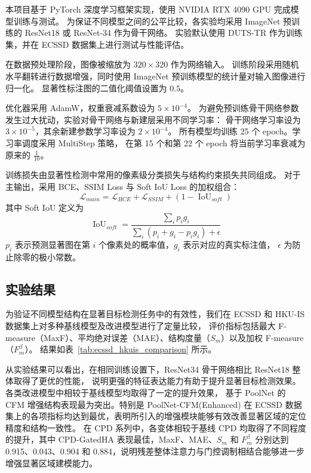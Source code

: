 \documentclass[UTF8,a4paper,10pt]{ctexart}
\begin{document}
本项目基于 PyTorch 深度学习框架实现，使用 NVIDIA RTX 4090 GPU 完成模型训练与测试。
为保证不同模型之间的公平比较，各实验均采用 ImageNet 预训练的 ResNet18 或 ResNet-34 作为骨干网络。
实验默认使用 DUTS-TR 作为训练集，并在 ECSSD 数据集上进行测试与性能评估。

在数据预处理阶段，图像被缩放为 $320 \times 320$ 作为网络输入。
训练阶段采用随机水平翻转进行数据增强，同时使用 ImageNet 预训练模型的统计量对输入图像进行归一化。
显著性标注图的二值化阈值设置为 $0.5$。

优化器采用 AdamW，权重衰减系数设为 $5\times10^{-4}$。
为避免预训练骨干网络参数发生过大扰动，实验对骨干网络与新建层采用不同学习率：
骨干网络学习率设为 $3\times10^{-5}$，其余新建参数学习率设为 $2\times10^{-4}$。
所有模型均训练 25 个 epoch。学习率调度采用 MultiStep 策略，
在第 15 个和第 22 个 epoch 将当前学习率衰减为原来的 $\frac{1}{10}$。

训练损失由显著性检测中常用的像素级分类损失与结构约束损失共同组成。
对于主输出，采用 BCE、SSIM Loss 与 Soft IoU Loss 的加权组合：
\[
\mathcal{L}_{main}
=
\mathcal{L}_{BCE}
+
\mathcal{L}_{SSIM}
+
\left(1-\operatorname{IoU}_{soft}\right)
\]
其中 Soft IoU 定义为
\[
\operatorname{IoU}_{soft}
=
\frac{\sum_i p_i g_i}
{\sum_i (p_i + g_i - p_i g_i) + \epsilon}
\]
$p_i$ 表示预测显著图在第 $i$ 个像素处的概率值，$g_i$ 表示对应的真实标注值，
$\epsilon$ 为防止除零的极小常数。



\subsection{实验结果}

为验证不同模型结构在显著目标检测任务中的有效性，我们在 ECSSD 和 HKU-IS 数据集上对多种基线模型及改进模型进行了定量比较，
评价指标包括最大 F-measure（MaxF）、平均绝对误差（MAE）、结构度量（$S_m$）以及加权 F-measure（$F_m^{\beta}$）。
结果如表~\ref{tab:ecssd_hkuis_comparison} 所示。

从实验结果可以看出，在相同训练设置下，ResNet34 骨干网络相比 ResNet18 整体取得了更优的性能，
说明更强的特征表达能力有助于提升显著目标检测效果。各类改进模型中相较于基线模型均取得了一定的提升效果，
基于 PoolNet 的 CFM 增强结构表现最为突出。特别是 PoolNet-CFM(Enhanced) 在 ECSSD 数据集上的各项指标均达到最优，表明所引入的增强模块能够有效改善显著区域的定位精度和结构一致性。
在 CPD 系列中，各变体相较于基线 CPD 均取得了不同程度的提升，其中 CPD-GatedHA 表现最佳，MaxF、MAE、$S_m$ 和 $F_m^{\beta}$ 分别达到 0.915、0.043、0.904 和 0.884，说明残差整体注意力与门控调制相结合能够进一步增强显著区域建模能力。
\end{document}
